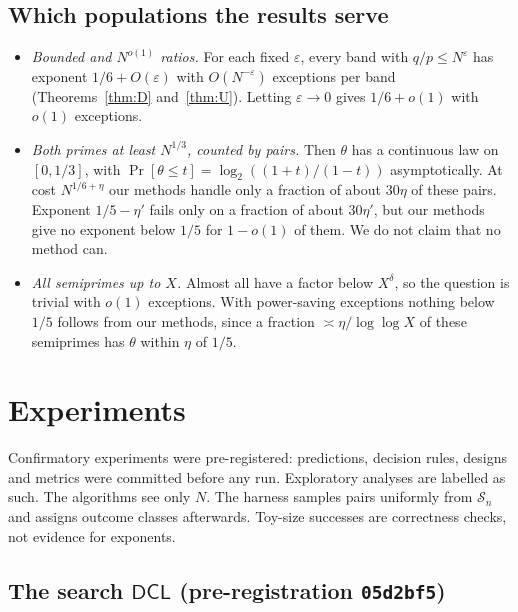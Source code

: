 \documentclass[11pt]{amsart}
\theoremstyle{definition}
\newcommand{\Sn}{\mathcal{S}_n}
\newcommand{\DCL}{\textsf{DCL}}
\begin{document}
\subsection{Which populations the results serve}
\begin{itemize}
\item \emph{Bounded and $N^{o(1)}$ ratios.} For each fixed $\varepsilon$, every band with
  $q/p\le N^{\varepsilon}$ has exponent $1/6+O(\varepsilon)$ with $O(N^{-\varepsilon})$ exceptions
  per band (Theorems~\ref{thm:D} and~\ref{thm:U}). Letting $\varepsilon\to0$ gives $1/6+o(1)$ with
  $o(1)$ exceptions.
\item \emph{Both primes at least $N^{1/3}$, counted by pairs.} Then $\theta$ has a continuous law
  on $[0,1/3]$, with $\Pr[\theta\le t]=\log_2((1+t)/(1-t))$ asymptotically. At cost
  $N^{1/6+\eta}$ our methods handle only a fraction of about $30\eta$ of these pairs. Exponent
  $1/5-\eta'$ fails only on a fraction of about $30\eta'$, but our methods give no exponent below
  $1/5$ for $1-o(1)$ of them. We do not claim that no method can.
\item \emph{All semiprimes up to $X$.} Almost all have a factor below $X^\delta$, so the
  question is trivial with $o(1)$ exceptions. With power-saving exceptions nothing below $1/5$
  follows from our methods, since a fraction $\asymp\eta/\log\log X$ of these semiprimes has
  $\theta$ within $\eta$ of $1/5$.
\end{itemize}

\section{Experiments}\label{sec:experiments}

Confirmatory experiments were pre-registered: predictions, decision rules, designs and metrics
were committed before any run. Exploratory analyses are labelled as such. The algorithms see only $N$. The harness samples pairs uniformly from
$\Sn$ and assigns outcome classes afterwards. Toy-size successes are correctness checks, not
evidence for exponents.

\subsection{The search \texorpdfstring{$\DCL$}{DCL} (pre-registration \texttt{05d2bf5})}
\end{document}
